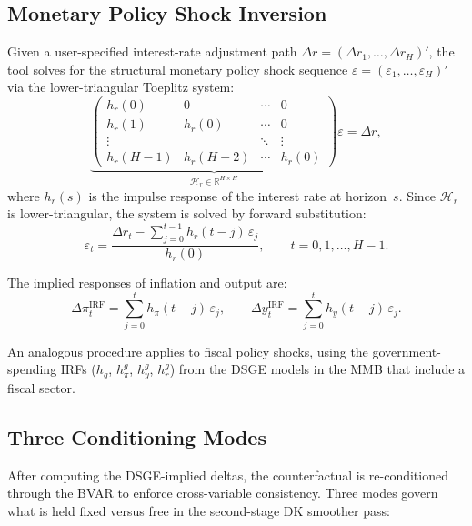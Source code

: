 \documentclass[11pt]{article}
\newcommand{\R}{\mathbb{R}}
\theoremstyle{definition}
\theoremstyle{remark}
\begin{document}
\subsection{Monetary Policy Shock Inversion}\label{sec:shock_inversion}

Given a user-specified interest-rate adjustment path
$\Delta r = (\Delta r_1, \ldots, \Delta r_H)'$, the tool solves for
the structural monetary policy shock sequence
$\varepsilon = (\varepsilon_1, \ldots, \varepsilon_H)'$ via the
lower-triangular Toeplitz system:
\begin{equation}\label{eq:toeplitz}
  \underbrace{\begin{pmatrix}
    h_r(0) & 0 & \cdots & 0 \\
    h_r(1) & h_r(0) & \cdots & 0 \\
    \vdots & & \ddots & \vdots \\
    h_r(H{-}1) & h_r(H{-}2) & \cdots & h_r(0)
  \end{pmatrix}}_{\mathcal{H}_r \in \R^{H \times H}}
  \varepsilon = \Delta r,
\end{equation}
where $h_r(s)$ is the impulse response of the interest rate at
horizon~$s$.  Since $\mathcal{H}_r$ is lower-triangular, the system is
solved by forward substitution:
\begin{equation}\label{eq:shock_inversion_formula}
  \varepsilon_t = \frac{\Delta r_t - \sum_{j=0}^{t-1}
    h_r(t-j)\, \varepsilon_j}{h_r(0)}, \qquad t = 0, 1, \ldots, H{-}1.
\end{equation}

The implied responses of inflation and output are:
\begin{equation}\label{eq:irf_delta}
  \Delta \pi_t^{\text{IRF}} = \sum_{j=0}^{t} h_\pi(t{-}j)\,
  \varepsilon_j,
  \qquad
  \Delta y_t^{\text{IRF}} = \sum_{j=0}^{t} h_y(t{-}j)\,
  \varepsilon_j.
\end{equation}

An analogous procedure applies to fiscal policy shocks, using the
government-spending IRFs ($h_g$, $h_\pi^g$, $h_y^g$, $h_r^g$) from
the DSGE models in the MMB that include a fiscal sector.

\subsection{Three Conditioning Modes}\label{sec:modes}

After computing the DSGE-implied deltas, the counterfactual is
re-conditioned through the BVAR to enforce cross-variable
consistency.  Three modes govern what is held fixed versus free in
the second-stage DK smoother pass:
\end{document}
